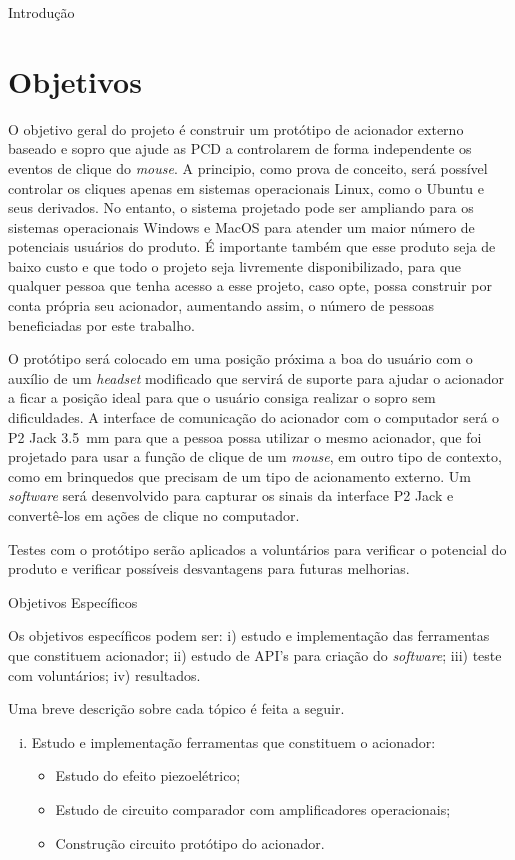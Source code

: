 \begin{chapter}{Introdução}
\section{Objetivos}

O objetivo geral do projeto é construir um protótipo de acionador externo
baseado e sopro que ajude as PCD a controlarem de forma independente os eventos
de clique do \textit{mouse}. A principio, como prova de conceito, será possível
controlar os cliques apenas em sistemas operacionais Linux, como o Ubuntu e seus
derivados. No entanto, o sistema projetado pode ser ampliando para os sistemas
operacionais Windows e MacOS para atender um maior número de potenciais usuários
do produto. É importante também que esse produto seja de baixo custo e que todo
o projeto seja livremente disponibilizado, para que qualquer pessoa que tenha
acesso a esse projeto, caso opte, possa construir por conta própria seu
acionador, aumentando assim, o número de pessoas beneficiadas por este trabalho.

O protótipo será colocado em uma posição próxima a boa do usuário com o auxílio
de um \textit{headset} modificado que servirá de suporte para ajudar o acionador
a ficar a posição ideal para que o usuário consiga realizar o sopro sem
dificuldades. A interface de comunicação do acionador com o computador será o
P2 Jack 3.5~mm para que a pessoa possa utilizar o mesmo acionador, que foi
projetado para usar a função de clique de um \textit{mouse}, em outro tipo de
contexto, como em brinquedos que precisam de um tipo de acionamento externo. Um
\textit{software} será desenvolvido para capturar os sinais da interface P2 Jack
e convertê-los em ações de clique no computador.

Testes com o protótipo serão aplicados a voluntários para verificar o potencial
do produto e verificar possíveis desvantagens para futuras melhorias.

\begin{subsection}{Objetivos Específicos}

Os objetivos específicos podem ser:
i) estudo e implementação das ferramentas que constituem acionador;
ii) estudo de API's para criação do \textit{software};
iii) teste com voluntários;
iv) resultados.

Uma breve descrição sobre cada tópico é feita a seguir.

\begin{enumerate}[i)]

\setlength\itemsep{-.2cm}
	\item Estudo e implementação ferramentas que constituem o acionador: \vspace{-.2cm}
	\begin{itemize}
		\item Estudo do efeito piezoelétrico;
		\item Estudo de circuito comparador com amplificadores operacionais;
		\item Construção circuito protótipo do acionador.
	\end{itemize}


\end{enumerate}
\end{subsection}
\end{chapter}
